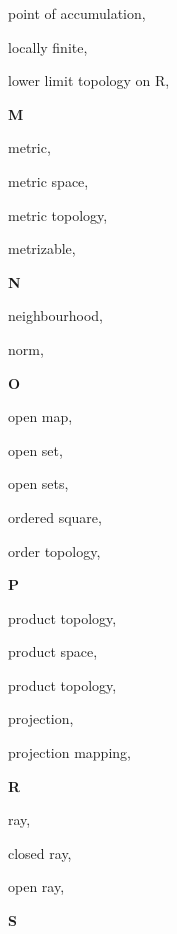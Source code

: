 \begin{multicols}{2}
point of accumulation, \pageref{def:LimitPoint}

locally finite, \pageref{def:LocallyFinite}

lower limit topology on R, \pageref{def:LowerLimitTopologyOnTheRealLine}

\vspace{1em}\noindent\large{\textbf{M}}

metric, \pageref{def:Metric}

metric space, \pageref{def:MetricSpace}

metric topology, \pageref{def:MetricTopology}

metrizable, \pageref{def:Metrizable}

\vspace{1em}\noindent\large{\textbf{N}}

neighbourhood, \pageref{def:Neighbourhood}

norm, \pageref{def:Norm}

\vspace{1em}\noindent\large{\textbf{O}}

open map, \pageref{def:OpenMap}

open set, \pageref{def:OpenSet}

open sets, \pageref{def:OpenSets}

ordered square, \pageref{def:OrderedSquare}

order topology, \pageref{def:OrderTopology}

\vspace{1em}\noindent\large{\textbf{P}}

product topology, \pageref{def:ProductTopology}

product space, \pageref{def:ProductTopologyInfinite}

product topology, \pageref{def:ProductTopologyInfinite}

projection, \pageref{def:Projection}

projection mapping, \pageref{def:ProjectionMapping}

\vspace{1em}\noindent\large{\textbf{R}}

ray, \pageref{def:Ray}

\hspace{1em}closed ray, \pageref{def:Ray}

\hspace{1em}open ray, \pageref{def:Ray}

\vspace{1em}\noindent\large{\textbf{S}}


\end{multicols}

